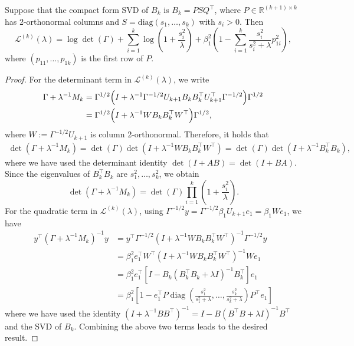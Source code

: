 \documentclass[]{myarticle}
\begin{document}
\begin{proposition}\label{prop:Lk}
  Suppose that the compact form SVD of $B_{k}$ is $B_{k}=PSQ^{\top}$, where $P\in\mathbb{R}^{(k+1)\times k}$ has 2-orthonormal columns and $S=\mathrm{diag}(s_1,\dots,s_k)$ with $s_i>0$. Then 
  \begin{equation}\label{L_k}
    \mathcal{L}^{(k)}(\lambda) = \log\det(\Gamma) + \sum_{i=1}^{k}\log\left(1+\frac{s_i^2}{\lambda}\right)
    + \beta_1^2\left(1-\sum_{i=1}^{k}\frac{s_i^2}{s_i^2+\lambda}p_{1i}^2 \right),
  \end{equation}
  where $(p_{11},\dots,p_{1k})$ is the first row of $P$.
\end{proposition}
\begin{proof}
  For the determinant term in $\mathcal{L}^{(k)}(\lambda)$, we write 
  \begin{align*}
    \Gamma+\lambda^{-1}M_k
    &= \Gamma^{1/2}\Bigl(I+\lambda^{-1}\Gamma^{-1/2}U_{k+1}B_kB_k^\top U_{k+1}^\top\Gamma^{-1/2}\Bigr)\Gamma^{1/2} \\
    &= \Gamma^{1/2}\Bigl(I+\lambda^{-1}WB_kB_k^\top W^{\top}\Bigr)\Gamma^{1/2},
  \end{align*}
  where $W:=\Gamma^{-1/2}U_{k+1}$ is column 2-orthonormal. Therefore, it holds that 
  \begin{align*}
    \det(\Gamma+\lambda^{-1}M_k)
    = \det(\Gamma)\det\left(I+\lambda^{-1}W B_k B_k^\top W^\top\right) 
    = \det(\Gamma)\det\left(I+\lambda^{-1}B_k^\top B_k \right),
  \end{align*}
  where we have used the determinant identity $\det(I+AB)=\det(I+BA)$. Since the eigenvalues of $B_{k}^{\top}B_{k}$ are $s_1^2,\dots,s_k^2$, we obtain 
  \begin{equation*}
    \det(\Gamma+\lambda^{-1}M_k) = \det(\Gamma)\prod_{i=1}^k\left(1+\frac{s_i^2}{\lambda}\right).
  \end{equation*}
  For the quadratic term in $\mathcal{L}^{(k)}(\lambda)$, using $\Gamma^{-1/2}y=\Gamma^{-1/2}\beta_1 U_{k+1} e_1=\beta_1 W e_1$, we have 
  \begin{align*}
    y^\top(\Gamma+\lambda^{-1}M_k)^{-1}y
    &= y^\top \Gamma^{-1/2}\left(I+\lambda^{-1}W B_k B_k^\top W^\top\right)^{-1}\Gamma^{-1/2}y \\
    &= \beta_1^2e_1^\top W^\top\left(I+\lambda^{-1}W B_k B_k^\top W^\top\right)^{-1}We_1 \\
    &= \beta_1^2e_1^\top \left[ I - B_{k}(B_{k}^{\top}B_{k}+\lambda I)^{-1}B_{k}^{\top} \right]e_{1} \\
    &= \beta_1^2\left[1-e_1^\top P\operatorname{diag}\left(\frac{s_1^2}{s_1^2+\lambda},\dots,\frac{s_k^2}{s_k^2+\lambda}\right)P^\top e_1\right]
  \end{align*}
  where we have used the identity $(I+\lambda^{-1}BB^\top)^{-1}=I-B(B^\top B+\lambda I)^{-1}B^\top$ and the SVD of $B_{k}$. Combining the above two terms leads to the desired result.
\end{proof}
\end{document}
